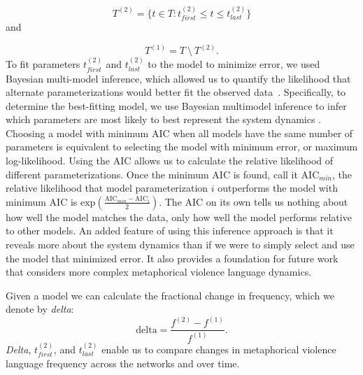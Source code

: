 \[ T^{(2)} = \{t \in T: t_{first}^{(2)} \leq t \leq t_{last}^{(2)} \} \]
\noindent and 

\[ T^{(1)} = T~\setminus~T^{(2)}.  \] \noindent To fit parameters
$t_{first}^{(2)}$ and $t_{last}^{(2)}$ to the model to minimize error, we used
Bayesian multi-model inference, which allowed us to quantify the likelihood that
alternate parameterizations would better fit the observed
data~\cite{Burnham2011}. Specifically, to determine the best-fitting model, we
use Bayesian multimodel inference to infer which parameters are most likely to
best represent the system dynamics \cite{Burnham2011}.  Choosing a model with
minimum AIC when all models have the same number of parameters is equivalent to
selecting the model with minimum error, or maximum log-likelihood. Using the AIC
allows us to calculate the relative likelihood of different parameterizations.
Once the minimum AIC is found, call it $\text{AIC}_{min}$, the relative
likelihood that model parameterization $i$ outperforms the model with minimum
AIC is $\text{exp}(\frac{\text{AIC}_{min} - \text{AIC}_i}{2})$. The AIC on
its own tells us nothing about how well the model matches the data, only  how
well the model performs relative to other models. An added feature of using this
inference approach is that it reveals more about the system dynamics than if we
were to simply select and use the  model that minimized error. It also provides
a foundation for future work that considers more complex metaphorical violence
language dynamics. 

Given a model we can calculate the fractional change in frequency, which we
denote by \emph{delta}: 
\begin{equation} 
  \text{delta} = \frac{f^{(2)} - f^{(1)}}{f^{(1)}}.  
  \label{eq:delta} 
\end{equation} 
\noindent \emph{Delta},
$t^{(2)}_{first}$, and $t^{(2)}_{last}$ enable us to compare changes in
metaphorical violence language frequency across the networks and over time.
